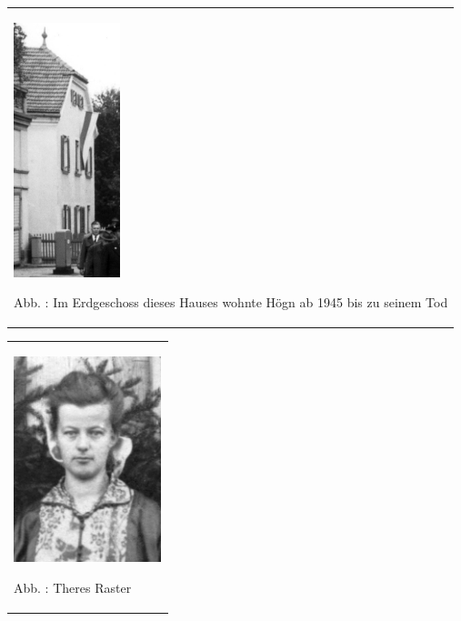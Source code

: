 \begin{center}
\begin{minipage}{3.491cm}
\begin{flushleft}
\tablefirsthead{}
\tablehead{}
\tabletail{}
\tablelasttail{}
\begin{supertabular}{m{3.291cm}}

\includegraphics[width=3.108cm,height=7.408cm]{pictures/zulassungsarbeit-img038.jpg}

Abb. : Im Erdgeschoss dieses Hauses wohnte
Högn ab 1945 bis zu seinem Tod\\
\end{supertabular}
\end{flushleft}
\end{minipage}
\end{center}
\begin{flushleft}
\tablefirsthead{}
\tablehead{}
\tabletail{}
\tablelasttail{}
\begin{supertabular}{m{4.6330004cm}}

\begin{center}

\includegraphics[width=4.3cm,height=5.973cm]{pictures/zulassungsarbeit-img039.jpg}

\end{center}
Abb. : Theres Raster\\
\end{supertabular}
\end{flushleft}
